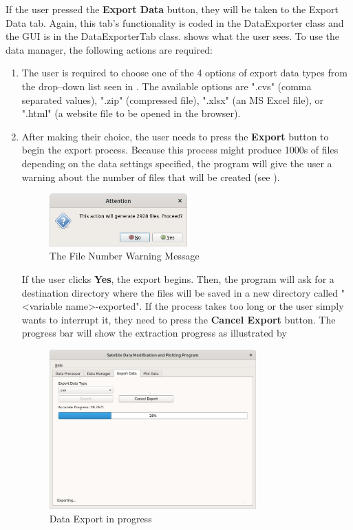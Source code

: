 \documentclass[../00_main.tex]{subfiles}
\begin{document}
If the user pressed the \textbf{Export Data} button, they will be taken to the
Export Data tab. Again, this tab's functionality is coded in the DataExporter 
class and the GUI is in the DataExporterTab class.  shows what the 
user sees. To use the data manager, the following actions are required:
\begin{enumerate}
    \item The user is required to choose one of the 4 options of export data
        types from the drop--down list seen in . The available
        options are ".cvs" (comma separated values), ".zip" (compressed file), 
        ".xlsx" (an MS Excel file), or ".html" (a website file to be opened in 
        the browser). 
    \item After making their choice, the user needs to press the
        \textbf{Export} button to begin the export process. Because this
        process might produce 1000s of files depending on the data settings
        specified, the program will give the user a warning about the number of
        files that will be created (see ). 
        \begin{figure}[H]
            \center
            \includegraphics[width=0.5\textwidth]{../graphics/de02}
            \caption{The File Number Warning Message}
            \label{de02}
        \end{figure}
        If the user clicks \textbf{Yes}, the
        export begins. Then, the program will ask for a destination directory 
        where the files will be saved in a new directory called "<variable
        name>-exported". If the process takes too long or the user simply wants 
        to interrupt it, they need to press the \textbf{Cancel Export} button. 
        The progress bar will show the extraction progress as illustrated by 
        \begin{figure}[H]
            \center
            \includegraphics[width=0.75\textwidth]{../graphics/de03}
            \caption{Data Export in progress}
            \label{de03}
        \end{figure}
\end{enumerate}
\end{document}
